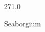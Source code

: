\documentclass[12pt]{article}
\begin{document}
\hfill{}
\vfill
\begin{center}
  {\fontsize{50}{60}
  }

  \vspace{1em}

  271.0

Seaborgium
\end{center}
\vfill
\end{document}

